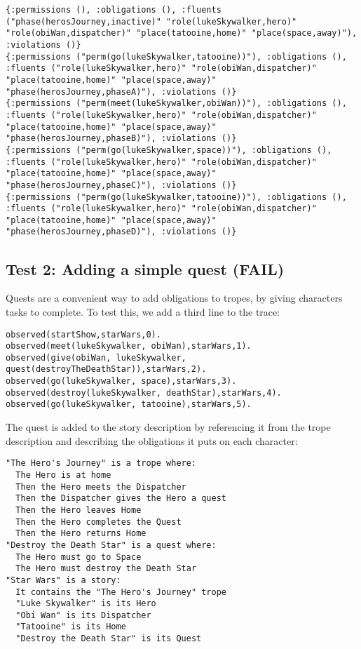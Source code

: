 \documentclass[11pt]{article}
\begin{document}
\begin{verbatim}
{:permissions (), :obligations (), :fluents ("phase(herosJourney,inactive)" "role(lukeSkywalker,hero)" "role(obiWan,dispatcher)" "place(tatooine,home)" "place(space,away)"), :violations ()}
{:permissions ("perm(go(lukeSkywalker,tatooine))"), :obligations (), :fluents ("role(lukeSkywalker,hero)" "role(obiWan,dispatcher)" "place(tatooine,home)" "place(space,away)" "phase(herosJourney,phaseA)"), :violations ()}
{:permissions ("perm(meet(lukeSkywalker,obiWan))"), :obligations (), :fluents ("role(lukeSkywalker,hero)" "role(obiWan,dispatcher)" "place(tatooine,home)" "place(space,away)" "phase(herosJourney,phaseB)"), :violations ()}
{:permissions ("perm(go(lukeSkywalker,space))"), :obligations (), :fluents ("role(lukeSkywalker,hero)" "role(obiWan,dispatcher)" "place(tatooine,home)" "place(space,away)" "phase(herosJourney,phaseC)"), :violations ()}
{:permissions ("perm(go(lukeSkywalker,tatooine))"), :obligations (), :fluents ("role(lukeSkywalker,hero)" "role(obiWan,dispatcher)" "place(tatooine,home)" "place(space,away)" "phase(herosJourney,phaseD)"), :violations ()}
\end{verbatim}

\subsection{Test 2: Adding a simple quest (FAIL)}
\label{sec:orgheadline2}

Quests are a convenient way to add obligations to tropes, by giving characters tasks to complete. To test this, we add a third line to the trace:

\begin{verbatim}
observed(startShow,starWars,0).
observed(meet(lukeSkywalker, obiWan),starWars,1).
observed(give(obiWan, lukeSkywalker, quest(destroyTheDeathStar)),starWars,2).
observed(go(lukeSkywalker, space),starWars,3).
observed(destroy(lukeSkywalker, deathStar),starWars,4).
observed(go(lukeSkywalker, tatooine),starWars,5).
\end{verbatim}

The quest is added to the story description by referencing it from the trope description and describing the obligations it puts on each character:

\begin{verbatim}
"The Hero's Journey" is a trope where:
  The Hero is at home
  Then the Hero meets the Dispatcher
  Then the Dispatcher gives the Hero a quest
  Then the Hero leaves Home
  Then the Hero completes the Quest
  Then the Hero returns Home
"Destroy the Death Star" is a quest where:
  The Hero must go to Space
  The Hero must destroy the Death Star
"Star Wars" is a story:
  It contains the "The Hero's Journey" trope
  "Luke Skywalker" is its Hero
  "Obi Wan" is its Dispatcher
  "Tatooine" is its Home
  "Destroy the Death Star" is its Quest
\end{verbatim}
\end{document}
